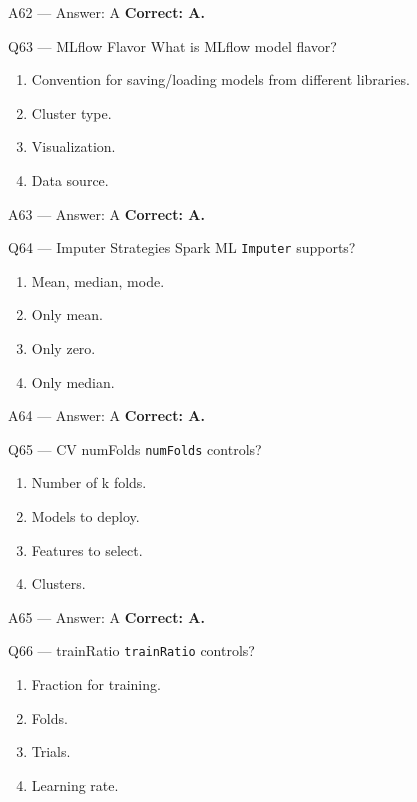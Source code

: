 \documentclass[aspectratio=169,9pt]{beamer}
\begin{document}
	\begin{frame}{A62 — Answer: A}
		\textbf{Correct: A.}
	\end{frame}
	
	\begin{frame}{Q63 — MLflow Flavor}
		What is MLflow model flavor?
		\begin{enumerate}[label=\Alph*.]
			\item Convention for saving/loading models from different libraries.
			\item Cluster type.
			\item Visualization.
			\item Data source.
		\end{enumerate}
	\end{frame}
	
	\begin{frame}{A63 — Answer: A}
		\textbf{Correct: A.}
	\end{frame}
	
	\begin{frame}{Q64 — Imputer Strategies}
		Spark ML \texttt{Imputer} supports?
		\begin{enumerate}[label=\Alph*.]
			\item Mean, median, mode.
			\item Only mean.
			\item Only zero.
			\item Only median.
		\end{enumerate}
	\end{frame}
	
	\begin{frame}{A64 — Answer: A}
		\textbf{Correct: A.}
	\end{frame}
	
	\begin{frame}{Q65 — CV numFolds}
		\texttt{numFolds} controls?
		\begin{enumerate}[label=\Alph*.]
			\item Number of k folds.
			\item Models to deploy.
			\item Features to select.
			\item Clusters.
		\end{enumerate}
	\end{frame}
	
	\begin{frame}{A65 — Answer: A}
		\textbf{Correct: A.}
	\end{frame}
	
	\begin{frame}{Q66 — trainRatio}
		\texttt{trainRatio} controls?
		\begin{enumerate}[label=\Alph*.]
			\item Fraction for training.
			\item Folds.
			\item Trials.
			\item Learning rate.
		\end{enumerate}
	\end{frame}
	
\end{document}
